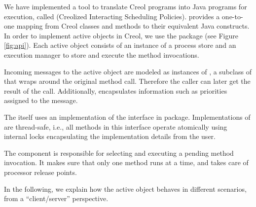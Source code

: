 We have implemented a tool to translate Creol programs into Java programs for execution, called {\em \Crisp} (Creolized Interacting Scheduling Policies).
\Crisp provides a one-to-one mapping from Creol classes and methods to their equivalent Java constructs. 
In order to implement active objects in Creol, we use the  package (see Figure \ref{fig:api}).
Each active object consists of an instance of a process store  and an execution manager to store and execute the method invocations. 

Incoming messages to the active object are modeled as instances of \MethodInvocation, a subclass of  that  wraps around the original method call.
Therefore the caller can later get the result of the call.
Additionally, \MethodInvocation encapsulates information such as priorities assigned to the message. 

The  itself uses an implementation of the  interface in  package. Implementations of  are thread-safe, i.e.,  all methods in this interface operate atomically using internal locks encapsulating the implementation details from the user. 

The  component is responsible for selecting and executing a pending method invocation.
It makes sure that only one method runs at a time, and takes care of processor release points.

In the following, we explain how the active object behaves in different scenarios, from a ``client/server'' perspective.  

% 


